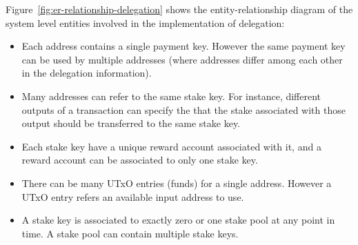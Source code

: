 \documentclass[11pt,a4paper]{article}
\begin{document}
Figure~\ref{fig:er-relationship-delegation} shows the entity-relationship
diagram of the system level entities involved in the implementation of
delegation:
\begin{itemize}
\item Each address contains a single payment key. However the same payment key
  can be used by multiple addresses (where addresses differ among each other in
  the delegation information).
\item Many addresses can refer to the same stake key. For instance, different
  outputs of a transaction can specify the that the stake associated with those
  output should be transferred to the same stake key.
\item Each stake key have a unique reward account associated with it, and a
  reward account can be associated to only one stake key.
\item There can be many UTxO entries (funds) for a single address. However a
  UTxO entry refers an available input address to use.
\item A stake key is associated to exactly zero or one stake pool at any point
  in time. A stake pool can contain multiple stake keys.
\end{itemize}
\end{document}
